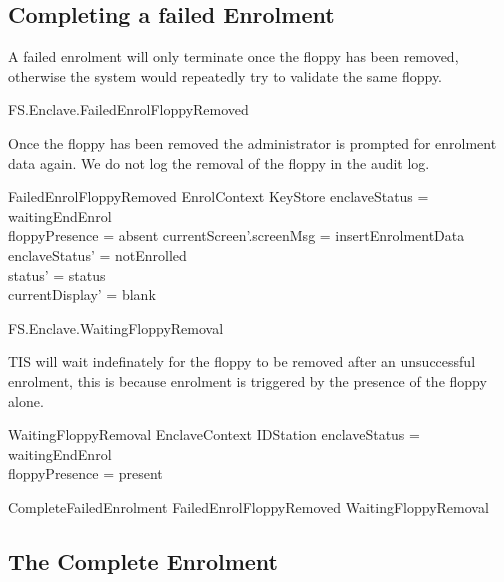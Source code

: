 \subsection{Completing a failed Enrolment}

A failed enrolment will only terminate once the floppy has been
removed, otherwise the system would repeatedly try to validate the
same floppy.

\begin{traceunit}{FS.Enclave.FailedEnrolFloppyRemoved}
\end{traceunit}


Once the floppy has been removed the administrator is prompted for
enrolment data again. We do not log the removal of the floppy in the
audit log.

\begin{schema}{FailedEnrolFloppyRemoved}
        EnrolContext
\also
        \Xi KeyStore
\where
        enclaveStatus = waitingEndEnrol
\\      floppyPresence = absent
\also
        currentScreen'.screenMsg = insertEnrolmentData
\also
        enclaveStatus' = notEnrolled
\\      status' = status
\\      currentDisplay' = blank
\end{schema}

\begin{traceunit}{FS.Enclave.WaitingFloppyRemoval}
\end{traceunit}

TIS will wait indefinately for the floppy to be removed after an
unsuccessful enrolment, this is because enrolment is triggered by the
presence of the floppy alone.

\begin{schema}{WaitingFloppyRemoval}
        EnclaveContext
\also
        \Xi IDStation
\where
        enclaveStatus = waitingEndEnrol
\\      floppyPresence = present
\end{schema}

\begin{zed}
        CompleteFailedEnrolment  FailedEnrolFloppyRemoved  
         \lor WaitingFloppyRemoval
\end{zed}

\subsection{The Complete Enrolment}

